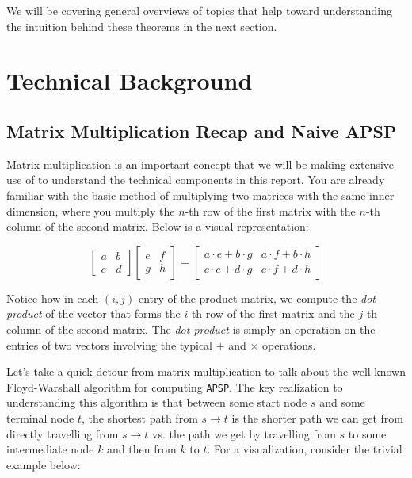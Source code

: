 \documentclass[12pt]{article}
\begin{document}
We will be covering general overviews of topics that help toward understanding the intuition behind these theorems in the next section.

\section{Technical Background}

\subsection{Matrix Multiplication Recap and Naive APSP}

Matrix multiplication is an important concept that we will be making extensive use of to understand the technical components in this report. You are already familiar with the basic method of multiplying two matrices with the same inner dimension, where you multiply the $n$-th row of the first matrix with the $n$-th column of the second matrix. Below is a visual representation:

\[
    \begin{bmatrix}
        a & b \\
        c & d
    \end{bmatrix}
    \begin{bmatrix}
        e & f \\
        g & h
    \end{bmatrix}
    =
    \begin{bmatrix}
        a \cdot e + b \cdot g & a \cdot f + b \cdot h \\
        c \cdot e + d \cdot g & c \cdot f + d \cdot h
    \end{bmatrix}
\]

Notice how in each $(i, j)$ entry of the product matrix, we compute the \emph{dot product} of the vector that forms the $i$-th row of the first matrix and the $j$-th column of the second matrix. The \emph{dot product} is simply an operation on the entries of two vectors involving the typical $+$ and $\times$ operations.

Let's take a quick detour from matrix multiplication to talk about the well-known Floyd-Warshall algorithm for computing \texttt{APSP}. The key realization to understanding this algorithm is that between some start node $s$ and some terminal node $t$, the shortest path from $s \to t$ is the shorter path we can get from directly travelling from $s \to t$ vs. the path we get by travelling from $s$ to some intermediate node $k$ and then from $k$ to $t$. For a visualization, consider the trivial example below:
\end{document}
